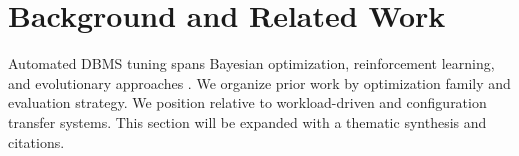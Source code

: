 \section{Background and Related Work}
Automated DBMS tuning spans Bayesian optimization, reinforcement learning, and evolutionary approaches \cite{vanaken2017ottertune,zhang2019cdbtune}.
We organize prior work by optimization family and evaluation strategy.
We position \sysname relative to workload-driven and configuration transfer systems.
This section will be expanded with a thematic synthesis and citations.

